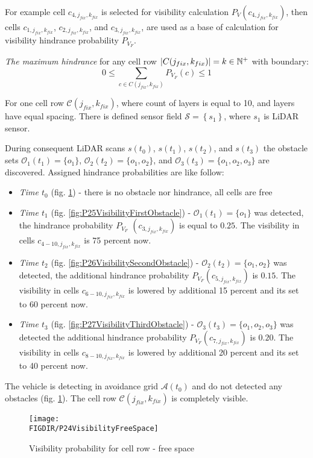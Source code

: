 \noindent For example cell $c_{4,j_{fix},k_{fix}}$ is selected for visibility calculation $P_{V}(c_{4,j_{fix},k_{fix}})$, then cells $c_{1,j_{fix},k_{fix}}$, $c_{2,j_{fix},k_{fix}}$, and $c_{3,j_{fix},k_{fix}}$, are used as a base of calculation for visibility hindrance probability $P_{V_F}$.

\noindent \emph{The maximum hindrance} for any cell row $|{C}(j_{fix},k_{fix})|=k\in \mathbb{N}^+$ with  boundary:
\begin{equation}
    0 \le \sum_{c\in{C}(j_{fix},k_{fix})} P_{V_F}(c) \le 1
\end{equation}

\noindent For one cell row $\mathscr{C}(j_{fix},k_{fix})$, where count of layers is equal to 10, and layers have equal spacing. There is defined sensor field $\mathscr{S}=\left\{s_1\right\}$, where $s_1$ is LiDAR sensor. 

During consequent LiDAR scans $s(t_0)$, $s(t_1)$, $s(t_2)$, and $s(t_3)$ the obstacle sets $\mathscr{O}_1(t_1)=\{o_1\}$, $\mathscr{O}_2(t_2)=\{o_1,o_2\}$, and $\mathscr{O}_3(t_3)=\{o_1,o_2,o_3\}$ are discovered. Assigned hindrance probabilities are like follow:
\begin{itemize}
    \item\emph{Time $t_0$} (fig. \ref{fig:P24VisibilityFreeSpace}) - there is no obstacle nor hindrance, all cells are free
    \item\emph{Time $t_1$} (fig. \ref{fig:P25VisibilityFirstObstacle}) - $\mathscr{O}_1(t_1)=\{o_1\}$ was detected, the hindrance probability $P_{V_F}$ $(c_{3,j_{fix},k_{fix}})$ is equal to $0.25$. The visibility in cells $c_{4-10,j_{fix},k_{fix}}$ is 75 percent now. 
    \item\emph{Time $t_2$} (fig. \ref{fig:P26VisibilitySecondObstacle}) - $\mathscr{O}_2(t_2)=\{o_1,o_2\}$ was detected, the additional hindrance probability  $P_{V_F}(c_{5,j_{fix},k_{fix}})$ is $0.15$. The visibility in cells $c_{6-10,j_{fix},k_{fix}}$ is lowered by additional 15 percent and its set to 60 percent now.
    \item\emph{Time $t_3$} (fig. \ref{fig:P27VisibilityThirdObstacle}) - $\mathscr{O}_3(t_3)=\{o_1,o_2,o_3\}$  was detected the additional hindrance probability  $P_{V_F}(c_{7,j_{fix},k_{fix}})$ is $0.20$. The visibility in cells $c_{8-10,j_{fix},k_{fix}}$ is lowered by additional 20 percent and its set to 40 percent now.
\end{itemize}

\noindent The vehicle is detecting in avoidance grid $\mathscr{A}(t_0)$ and do not detected any obstacles (fig. \ref{fig:P24VisibilityFreeSpace}). The cell row $\mathscr{C}(j_{fix},k_{fix})$ is completely visible.
\begin{figure}[H]
    \centering
    \texttt{[image: \\FIGDIR/P24VisibilityFreeSpace]}
    \caption{Visibility probability for cell row - free space}
    \label{fig:P24VisibilityFreeSpace}
\end{figure}

